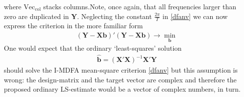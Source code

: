 \documentclass[11pt]{article}
\begin{document}
where $\textrm{Vec}_\textrm{col}$ stacks columns.Note, once again, that all frequencies larger than zero are duplicated in $\mathbf{Y}$. Neglecting the constant $\frac{2\pi}{T} $ in  \ref{dfanv} we can now express the criterion in the more familiar form
\begin{eqnarray}\label{irk}
(\mathbf{Y-Xb})'(\mathbf{Y-Xb})\to\min_{\mathbf{b}}
\end{eqnarray}
One would expect that the ordinary `least-squares' solution
\begin{eqnarray*}
\mathbf{\hat{b}}=\left(\mathbf{X'X}\right)^{-1}\mathbf{X'}\mathbf{Y}
\end{eqnarray*}
should solve the I-MDFA mean-square criterion \ref{dfanv} but this assumption is wrong: the design-matrix and the target vector are complex and therefore the proposed ordinary 
LS-estimate would be a vector of complex numbers, in turn. \\
\end{document}

